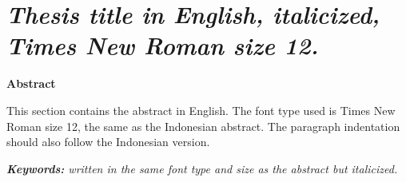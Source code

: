 \chapter*{\large \textit{Thesis title in English, italicized, Times New Roman size 12.}}

\begin{center}
    \textbf{Abstract}
\end{center}
This section contains the abstract in English. The font type used is Times New Roman size 12, the same as the Indonesian abstract. The paragraph indentation should also follow the Indonesian version.

\vspace{0.5cm}
\noindent \textit{\textbf{Keywords:} written in the same font type and size as the abstract but italicized.}
